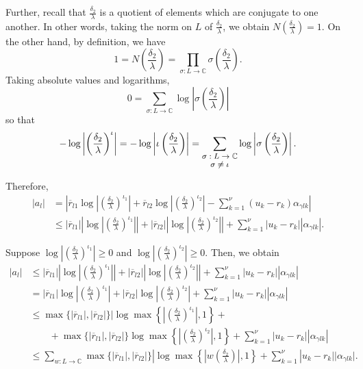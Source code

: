 Further, recall that $\frac{\delta_2}{\lambda}$ is a quotient of elements which are conjugate to one another. In other words, taking the norm on $L$ of $\frac{\delta_2}{\lambda}$, we obtain $N\left(\frac{\delta_2}{\lambda}\right) = 1.$ On the other hand, by definition, we have 
\[1 = N\left(\frac{\delta_2}{\lambda}\right) = \prod_{\sigma: L \to \mathbb{C}} \sigma \left(\frac{\delta_2}{\lambda}\right).\]
Taking absolute values and logarithms, 
\[0 = \sum_{\sigma: L \to \mathbb{C}} \log\left|\sigma \left(\frac{\delta_2}{\lambda}\right)\right|\]
so that
\[-\log\left|\left(\frac{\delta_2}{\lambda}\right)^{\iota}\right| = -\log\left|\iota \left(\frac{\delta_2}{\lambda}\right)\right| = \sum_{\shortstack{\footnotesize $\sigma: L \to \mathbb{C} $\\ \footnotesize $ \sigma \neq \iota$}} \log\left|\sigma \left(\frac{\delta_2}{\lambda}\right)\right|.\]

Therefore,
\begin{align*}
|a_l| 	& = \left|\overline{r}_{l1}\log\left|\left(\frac{\delta_2}{\lambda}\right)^{\iota_1}\right| + \overline{r}_{l2}\log\left|\left(\frac{\delta_2}{\lambda}\right)^{\iota_2}\right| - \sum_{k=1}^{\nu}(u_k-r_k)\alpha_{\gamma l k}\right|\\
	& \leq |\overline{r}_{l1}|\left|\log\left|\left(\frac{\delta_2}{\lambda}\right)^{\iota_1}\right|\right| + |\overline{r}_{l2}|\left|\log\left|\left(\frac{\delta_2}{\lambda}\right)^{\iota_2}\right|\right| + \sum_{k=1}^{\nu}|u_k-r_k||\alpha_{\gamma l k}|.
\end{align*}

Suppose $\log\left|\left(\frac{\delta_2}{\lambda}\right)^{\iota_1}\right| \geq 0$ and $\log\left|\left(\frac{\delta_2}{\lambda}\right)^{\iota_2}\right| \geq 0$. Then, we obtain
\begin{align*}
|a_l| 	& \leq |\overline{r}_{l1}|\left|\log\left|\left(\frac{\delta_2}{\lambda}\right)^{\iota_1}\right|\right| + |\overline{r}_{l2}|\left|\log\left|\left(\frac{\delta_2}{\lambda}\right)^{\iota_2}\right|\right| + \sum_{k=1}^{\nu}|u_k-r_k||\alpha_{\gamma l k}|\\
	& = |\overline{r}_{l1}|\log\left|\left(\frac{\delta_2}{\lambda}\right)^{\iota_1}\right| + |\overline{r}_{l2}|\log\left|\left(\frac{\delta_2}{\lambda}\right)^{\iota_2}\right| + \sum_{k=1}^{\nu}|u_k-r_k||\alpha_{\gamma l k}|\\
	& \leq \max\{|\overline{r}_{l1}|, |\overline{r}_{l2}|\}|\log\max\left\{\left|\left(\frac{\delta_2}{\lambda}\right)^{\iota_1}\right|,1\right\} + \\
	& \quad \quad +\max\{|\overline{r}_{l1}|, |\overline{r}_{l2}|\}\log\max\left\{\left|\left(\frac{\delta_2}{\lambda}\right)^{\iota_2}\right|,1\right\} + \sum_{k=1}^{\nu}|u_k-r_k||\alpha_{\gamma l k}|\\
	&  \leq \sum_{w: L \to \mathbb{C}}\max\{|\overline{r}_{l1}|, |\overline{r}_{l2}|\}|\log\max\left\{\left|w\left(\frac{\delta_2}{\lambda}\right)\right|,1\right\} + \sum_{k=1}^{\nu}|u_k-r_k||\alpha_{\gamma l k}|.
\end{align*}

